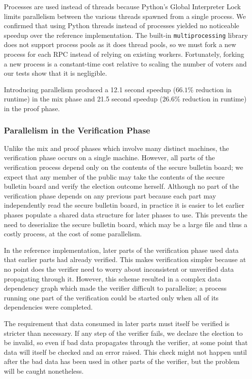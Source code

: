 Processes are used instead of threads because Python's Global Interpreter Lock limits parallelism between the various threads spawned from a single process. We confirmed that using Python threads instead of processes yielded no noticeable speedup over the reference implementation. The built-in \texttt{multiprocessing} library does not support process pools as it does thread pools, so we must fork a new process for each RPC instead of relying on existing workers. Fortunately, forking a new process is a constant-time cost relative to scaling the number of voters and our tests show that it is negligible.

Introducing parallelism produced a 12.1 second speedup ($66.1\%$ reduction in runtime) in the mix phase and 21.5 second speedup ($26.6\%$ reduction in runtime) in the proof phase.

\subsubsection{Parallelism in the Verification Phase}

Unlike the mix and proof phases which involve many distinct machines, the verification phase occurs on a single machine. However, all parts of the verification process depend only on the contents of the secure bulletin board; we expect that any member of the public may take the contents of the secure bulletin board and verify the election outcome herself. Although no part of the verification phase depends on any previous part because each part may independently read the secure bulletin board, in practice it is easier to let earlier phases populate a shared data structure for later phases to use. This prevents the need to deserialize the secure bulletin board, which may be a large file and thus a costly process, at the cost of some parallelism.

In the reference implementation, later parts of the verification phase used data that earlier parts had already verified. This makes verification simpler because at no point does the verifier need to worry about inconsistent or unverified data propagating through it. However, this scheme resulted in a complex data dependency graph which made the verifier difficult to parallelize; a process running one part of the verification could be started only when all of its dependencies were completed.

The requirement that data consumed in later parts must itself be verified is stricter than necessary. If any step of the verifier fails, we declare the election to be invalid, so even if bad data propagates through the verifier, at some point that data will itself be checked and an error raised. This check might not happen until after the bad data has been used in other parts of the verifier, but the problem will be caught nonetheless.

